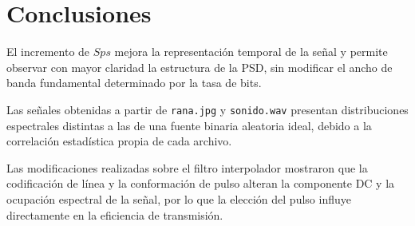 
\section{Conclusiones}

El incremento de \(Sps\) mejora la representación temporal de la señal y permite observar con mayor claridad la estructura de la PSD, sin modificar el ancho de banda fundamental determinado por la tasa de bits.


Las señales obtenidas a partir de \texttt{rana.jpg} y \texttt{sonido.wav} presentan distribuciones espectrales distintas a las de una fuente binaria aleatoria ideal, debido a la correlación estadística propia de cada archivo.


Las modificaciones realizadas sobre el filtro interpolador mostraron que la codificación de línea y la conformación de pulso alteran la componente DC y la ocupación espectral de la señal, por lo que la elección del pulso influye directamente en la eficiencia de transmisión.
